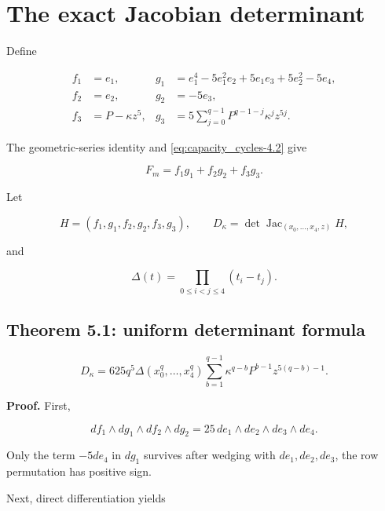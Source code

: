 \hypertarget{capacity_cycles-the-exact-jacobian-determinant}{%
\section{The exact Jacobian
determinant}\label{capacity_cycles-the-exact-jacobian-determinant}}

Define

\[
\begin{aligned}
f_1&=e_1,&g_1&=e_1^4-5e_1^2e_2+5e_1e_3+5e_2^2-5e_4,\\
f_2&=e_2,&g_2&=-5e_3,\\
f_3&=P-\kappa z^5,&g_3&=5\sum_{j=0}^{q-1}P^{q-1-j}\kappa^jz^{5j}.
\end{aligned}
\]

The geometric-series identity and \eqref{eq:capacity_cycles-4.2} give

\begin{equation}\label{eq:capacity_cycles-5.1}
F_m=f_1g_1+f_2g_2+f_3g_3.\end{equation}

Let

\[
H=(f_1,g_1,f_2,g_2,f_3,g_3),\qquad
D_\kappa=\det\operatorname{Jac}_{(x_0,\ldots,x_4,z)}H,
\]

and

\[
\Delta(t)=\prod_{0\le i<j\le4}(t_i-t_j).
\]

\hypertarget{capacity_cycles-theorem-5.1-uniform-determinant-formula}{%
\subsection{Theorem 5.1: uniform determinant
formula}\label{capacity_cycles-theorem-5.1-uniform-determinant-formula}}

\begin{equation}\label{eq:capacity_cycles-5.2}
\boxed{
D_\kappa=625q^5\Delta(x_0^q,\ldots,x_4^q)
\sum_{b=1}^{q-1}\kappa^{q-b}P^{b-1}z^{5(q-b)-1}.
}\end{equation}

\textbf{Proof.} First,

\begin{equation}\label{eq:capacity_cycles-5.3}
df_1\wedge dg_1\wedge df_2\wedge dg_2
=25\,de_1\wedge de_2\wedge de_3\wedge de_4.\end{equation}

Only the term \(-5de_4\) in \(dg_1\) survives after wedging with
\(de_1,de_2,de_3\), the row permutation has positive sign.

Next, direct differentiation yields

